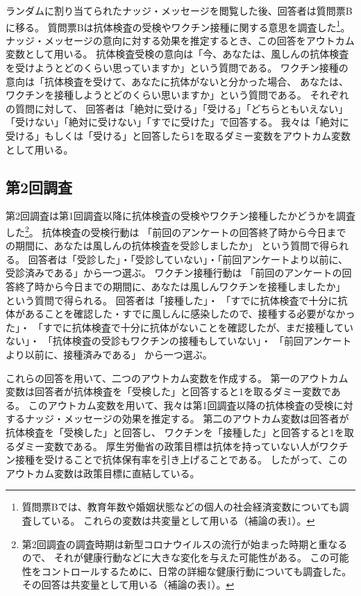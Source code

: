 \documentclass[
  11pt,
  a4paper,
]{article}
\begin{document}
ランダムに割り当てられたナッジ・メッセージを閲覧した後、回答者は質問票Bに移る。
質問票Bは抗体検査の受検やワクチン接種に関する意思を調査した\footnote{質問票Bでは、教育年数や婚姻状態などの個人の社会経済変数についても調査している。
  これらの変数は共変量として用いる（補論の表1）。}。
ナッジ・メッセージの意向に対する効果を推定するとき、この回答をアウトカム変数として用いる。
抗体検査受検の意向は「今、あなたは、風しんの抗体検査を受けようとどのくらい思っていますか」という質問である。
ワクチン接種の意向は「抗体検査を受けて、あなたに抗体がないと分かった場合、
あなたは、ワクチンを接種しようとどのくらい思いますか」という質問である。
それぞれの質問に対して、
回答者は「絶対に受ける」「受ける」「どちらともいえない」「受けない」「絶対に受けない」「すでに受けた」で回答する。
我々は「絶対に受ける」もしくは「受ける」と回答したら1を取るダミー変数をアウトカム変数として用いる。

\hypertarget{wave2}{%
\subsection{第2回調査}\label{wave2}}

第2回調査は第1回調査以降に抗体検査の受検やワクチン接種したかどうかを調査した\footnote{第2回調査の調査時期は新型コロナウイルスの流行が始まった時期と重なるので、
  それが健康行動などに大きな変化を与えた可能性がある。
  この可能性をコントロールするために、日常の詳細な健康行動についても調査した。
  その回答は共変量として用いる（補論の表1）。}。
抗体検査の受検行動は
「前回のアンケートの回答終了時から今日までの期間に、あなたは風しんの抗体検査を受診しましたか」
という質問で得られる。
回答者は「受診した」・「受診していない」・「前回アンケートより以前に、受診済みである」から一つ選ぶ。
ワクチン接種行動は
「前回のアンケートの回答終了時から今日までの期間に、あなたは風しんワクチンを接種しましたか」
という質問で得られる。
回答者は「接種した」・
「すでに抗体検査で十分に抗体があることを確認した・すでに風しんに感染したので、接種する必要がなかった」・
「すでに抗体検査で十分に抗体がないことを確認したが、まだ接種していない」・
「抗体検査の受診もワクチンの接種もしていない」・
「前回アンケートより以前に、接種済みである」
から一つ選ぶ。

これらの回答を用いて、二つのアウトカム変数を作成する。
第一のアウトカム変数は回答者が抗体検査を「受検した」と回答すると1を取るダミー変数である。
このアウトカム変数を用いて、我々は第1回調査以降の抗体検査の受検に対するナッジ・メッセージの効果を推定する。
第二のアウトカム変数は回答者が抗体検査を「受検した」と回答し、
ワクチンを「接種した」と回答すると1を取るダミー変数である。
厚生労働省の政策目標は抗体を持っていない人がワクチン接種を受けることで抗体保有率を引き上げることである。
したがって、このアウトカム変数は政策目標に直結している。
\end{document}
